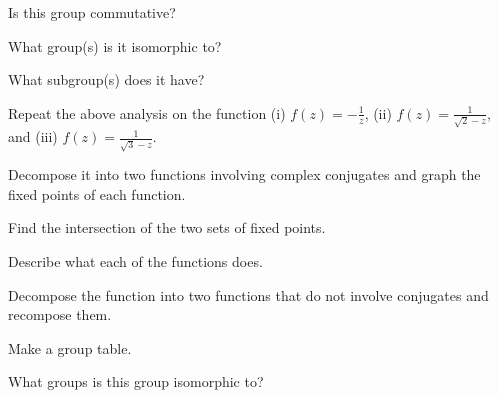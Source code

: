 \documentclass[../key.tex]{subfiles}
\begin{document}
\begin{inner_problem}
\item Is this group commutative?
\end{inner_problem}

\begin{inner_problem}
\item What group(s) is it isomorphic to?
\end{inner_problem}

\begin{inner_problem}
\item What subgroup(s) does it have?
\end{inner_problem}

\begin{outer_problem}
\item Repeat the above analysis on the function (i) $f(z)=-\frac{1}{z}$, (ii) $f(z)=\frac{1}{\sqrt{2}-z}$, and (iii) $f(z)=\frac{1}{\sqrt{3}-z}$.
\end{outer_problem}

\begin{inner_problem}[start=1]
\item Decompose it into two functions involving complex conjugates and graph the fixed points of each function.
\end{inner_problem}

\begin{inner_problem}
\item Find the intersection of the two sets of fixed points.
\end{inner_problem}

\begin{inner_problem}
\item Describe what each of the functions does.
\end{inner_problem}

\begin{inner_problem}
\item Decompose the function into two functions that do not involve conjugates and recompose them.
\end{inner_problem}

\begin{inner_problem}
\item Make a group table.
\end{inner_problem}

\begin{inner_problem}
\item What groups is this group isomorphic to?
\end{inner_problem}
\end{document}
